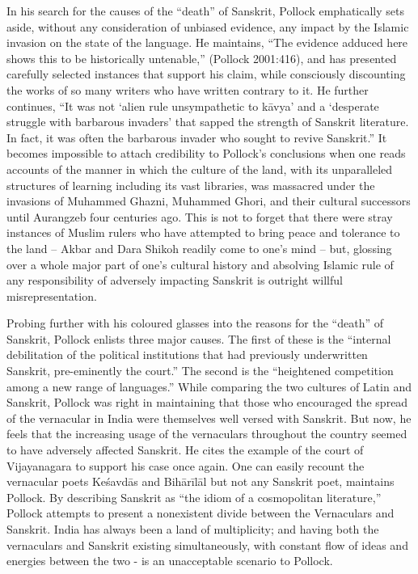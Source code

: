 In his search for the causes of the “death” of Sanskrit, Pollock emphatically sets aside, without any consideration of unbiased evidence, any impact by the Islamic invasion on the state of the language. He maintains, “The evidence adduced here shows this to be historically untenable,” (Pollock 2001:416), and has presented carefully selected instances that support his claim, while consciously discounting the works of so many writers who have written contrary to it. He further continues, “It was not ‘alien rule unsympathetic to kāvya’ and a ‘desperate struggle with barbarous invaders’ that sapped the strength of Sanskrit literature. In fact, it was often the barbarous invader who sought to revive Sanskrit.” It becomes impossible to attach credibility to Pollock’s conclusions when one reads accounts of the manner in which the culture of the land, with its unparalleled structures of learning including its vast libraries, was massacred under the invasions of Muhammed Ghazni, Muhammed Ghori, and their cultural successors until Aurangzeb four centuries ago. This is not to forget that there were stray instances of Muslim rulers who have attempted to bring peace and tolerance to the land – Akbar and Dara Shikoh readily come to one’s mind – but, glossing over a whole major part of one’s cultural history and absolving Islamic rule of any responsibility of adversely impacting Sanskrit is outright willful misrepresentation.

Probing further with his coloured glasses into the reasons for the “death” of Sanskrit, Pollock enlists three major causes. The first of these is the “internal debilitation of the political institutions that had previously underwritten Sanskrit, pre-eminently the court.” The second is the “heightened competition among a new range of languages.” While comparing the two cultures of Latin and Sanskrit, Pollock was right in maintaining that those who encouraged the spread of the vernacular in India were themselves well versed with Sanskrit. But now, he feels that the increasing usage of the vernaculars throughout the country seemed to have adversely affected Sanskrit. He cites the example of the court of Vijayanagara to support his case once again. One can easily recount the vernacular poets Keśavdās and Bihārīlāl but not any Sanskrit poet, maintains Pollock. By describing Sanskrit as “the idiom of a cosmopolitan literature,” Pollock attempts to present a nonexistent divide between the Vernaculars and Sanskrit. India has always been a land of multiplicity; and having both the vernaculars and Sanskrit existing simultaneously, with constant flow of ideas and energies between the two - is an unacceptable scenario to Pollock. 

